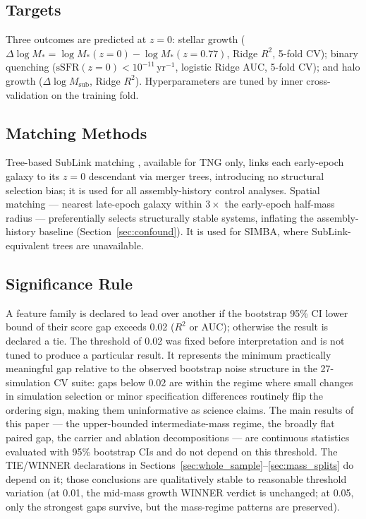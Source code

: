 \documentclass[twocolumn,linenumbers]{aastex701}
\newcommand{\logM}{\log M_*}
\newcommand{\dlogM}{\Delta\!\logM}
\begin{document}
\subsection{Targets}
\label{sec:targets}

Three outcomes are predicted at $z = 0$: stellar growth
($\dlogM = \logM(z=0) - \logM(z=0.77)$, Ridge $R^2$, 5-fold CV);
binary quenching ($\mathrm{sSFR}(z=0) < 10^{-11}\,\mathrm{yr}^{-1}$,
logistic Ridge AUC, 5-fold CV); and halo growth ($\Delta\log M_\mathrm{sub}$,
Ridge $R^2$).
Hyperparameters are tuned by inner cross-validation on the training fold.

\subsection{Matching Methods}
\label{sec:matching}

Tree-based SubLink matching \citep{rodriguez-gomez2015}, available for TNG
only, links each early-epoch galaxy to its $z=0$ descendant via merger trees,
introducing no structural selection bias; it is used for all assembly-history
control analyses.
Spatial matching --- nearest late-epoch galaxy within $3\times$ the
early-epoch half-mass radius --- preferentially selects structurally stable
systems, inflating the assembly-history baseline (Section~\ref{sec:confound}).
It is used for SIMBA, where SubLink-equivalent trees are unavailable.

\subsection{Significance Rule}
\label{sec:verdict}

A feature family is declared to lead over another if the bootstrap 95\% CI
lower bound of their score gap exceeds 0.02 ($R^2$ or AUC); otherwise the
result is declared a tie.
The threshold of 0.02 was fixed before interpretation and is not tuned to
produce a particular result.
It represents the minimum practically meaningful gap relative to the
observed bootstrap noise structure in the 27-simulation CV suite: gaps
below 0.02 are within the regime where small changes in simulation selection
or minor specification differences routinely flip the ordering sign, making
them uninformative as science claims.
The main results of this paper --- the upper-bounded intermediate-mass regime,
the broadly flat paired gap, the carrier and ablation decompositions --- are
continuous statistics evaluated with 95\% bootstrap CIs and do not depend
on this threshold.
The TIE/WINNER declarations in
Sections~\ref{sec:whole_sample}--\ref{sec:mass_splits} do depend on it;
those conclusions are qualitatively stable to reasonable threshold
variation (at 0.01, the mid-mass growth WINNER verdict is unchanged; at
0.05, only the strongest gaps survive, but the mass-regime patterns are
preserved).
\end{document}
